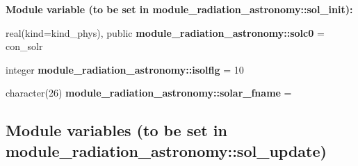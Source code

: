 \begin{Indent}\textbf{ Module variable (to be set in module\+\_\+radiation\+\_\+astronomy\+:\+:sol\+\_\+init)\+:}\par
\begin{DoxyCompactItemize}
\item 
real(kind=kind\+\_\+phys), public {\bfseries module\+\_\+radiation\+\_\+astronomy\+::solc0} = con\+\_\+solr
\item 
integer {\bfseries module\+\_\+radiation\+\_\+astronomy\+::isolflg} = 10
\item 
character(26) {\bfseries module\+\_\+radiation\+\_\+astronomy\+::solar\+\_\+fname} = \textquotesingle{} \textquotesingle{}
\end{DoxyCompactItemize}
\end{Indent}
\subsection*{Module variables (to be set in module\+\_\+radiation\+\_\+astronomy\+:\+:sol\+\_\+update)}
